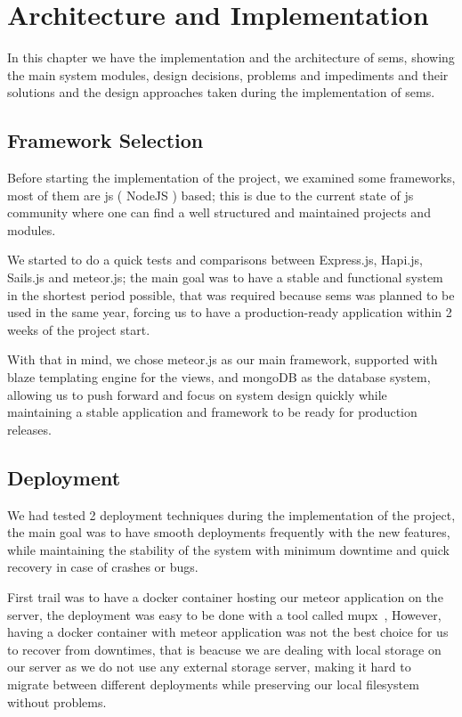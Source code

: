 \chapter{Architecture and Implementation}
\label{chap:architecture_and_implementation}

In this chapter we have the implementation and the architecture of \ac{sems}, showing the main system modules, design decisions,
problems and impediments and their solutions and the design approaches taken during the implementation of \ac{sems}.

\section{Framework Selection}
\label{sec:framework_selection}
Before starting the implementation of the project, we examined some frameworks, most of them are \ac{js} ( NodeJS ) based;
this is due to the current state of \ac{js} community where one can find a well structured and maintained projects and modules.

\newParagraph
We started to do a quick tests and comparisons between Express.js, Hapi.js, Sails.js and meteor.js; the main goal was to have a stable
and functional system in the shortest period possible, that was required because \ac{sems} was planned to be used in the same year, forcing
us to have a production-ready application within 2 weeks of the project start.

\newParagraph
With that in mind, we chose meteor.js as our main framework, supported with blaze templating engine for the views, and mongoDB as the
database system, allowing us to push forward and focus on system design quickly while maintaining a stable application and framework
to be ready for production releases.

\section{Deployment}
\label{sec:deployment}
We had tested 2 deployment techniques during the implementation of the project, the main goal was to have smooth deployments frequently with
the new features, while maintaining the stability of the system with minimum downtime and quick recovery in case of crashes or bugs.

\newParagraph
First trail was to have a docker container hosting our meteor application on the server, the deployment was easy to be done with a tool
called mupx~\cite{mupx}, However, having a docker container with meteor application was not the best choice for us to recover from downtimes,
that is beacuse we are dealing with local storage on our server as we do not use any external storage server, making it hard to migrate between
different deployments while preserving our local filesystem without problems.

